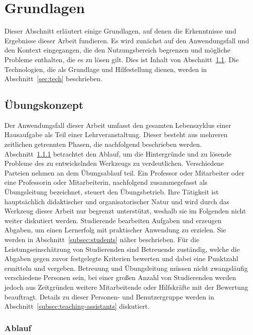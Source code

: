 \chapter{Grundlagen}\label{ch:basics}

Dieser Abschnitt erläutert einige Grundlagen, auf denen die Erkenntnisse und Ergebnisse dieser Arbeit fundieren.
Es wird zunächst auf den Anwendungsfall und den Kontext eingegangen, die den Nutzungsbereich begrenzen und mögliche Probleme enthalten, die es zu lösen gilt.
Dies ist Inhalt von Abschnitt~\ref{sec:programming-assignments}.
Die Technologien, die als Grundlage und Hilfestellung dienen, werden in Abschnitt~\ref{sec:tech} beschrieben.

\section{Übungskonzept}\label{sec:programming-assignments}

Der Anwendungsfall dieser Arbeit umfasst den gesamten Lebenszyklus einer Hausaufgabe als Teil einer Lehrveranstaltung.
Dieser besteht aus mehreren zeitlichen getrennten Phasen, die nachfolgend beschrieben werden.
Abschnitt~\ref{subsec:workflow} betrachtet den Ablauf, um die Hintergründe und zu lösende Probleme des zu entwickelnden Werkzeugs zu verdeutlichen.
Verschiedene Parteien nehmen an dem Übungsablauf teil.
Ein Professor oder Mitarbeiter oder eine Professorin oder Mitarbeiterin, nachfolgend zusammegefasst als Übungsleitung bezeichnet, steuert den Übungsbetrieb.
Ihre Tätigkeit ist hauptsächlich didaktischer und organisatorischer Natur und wird durch das Werkzeug dieser Arbeit nur begrenzt unterstützt, weshalb sie im Folgenden nicht weiter diskutiert werden.
Studierende bearbeiten Aufgaben und erzeugen Abgaben, um einen Lernerfolg mit praktischer Anwendung zu erzielen.
Sie werden in Abschnitt~\ref{subsec:students} näher beschrieben.
Für die Leistungseinschätzung von Studierenden sind Betreuende zuständig, welche die Abgaben gegen zuvor festgelegte Kriterien bewerten und dabei eine Punktzahl ermitteln und vergeben.
Betreuung und Übungsleitung müssen nicht zwangsläufig verschiedene Personen sein, bei einer großen Anzahl von Studierenden werden jedoch aus Zeitgründen weitere Mitarbeitende oder Hilfskräfte mit der Bewertung beauftragt.
Details zu dieser Personen- und Benutzergruppe werden in Abschnitt~\ref{subsec:teaching-assistants} diskutiert.

\subsection{Ablauf}\label{subsec:workflow}

